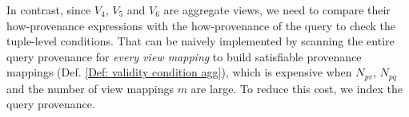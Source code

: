 \begin{example}






In contrast, since $V_4$, $V_5$ and $V_6$ are aggregate views, we need to compare their how-provenance expressions with the how-provenance of the query to check the {tuple-level conditions}. That can be naively implemented by scanning the entire query provenance for {\em every view mapping} to build satisfiable provenance mappings (Def. \ref{Def: validity condition agg}), which is expensive when $N_{pv}$, $N_{pq}$ and the number of view mappings $m$ are large.  To reduce this cost, we index the query provenance.


\end{example}
